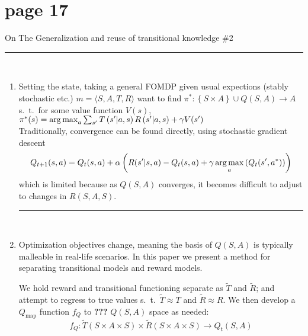 \section*{page 17}

On The Generalization and reuse of transitional knowledge \#2\\

\hrule
{\ }\\
\begin{enumerate}[label=\protect\circled{\arabic*}]

\item Setting the state, taking a general FOMDP given usual expections (stably stochastic etc.) $m=\langle S,A,T,R \rangle$ want to find $\pi^{\ast}:\left\{ S \times A \right\} \cup Q(S,A) \rightarrow A$ s.\ t.\ for some value function $V(s)$, $\pi^{\ast}(s) = \operatorname*{arg\,max}_{a} \sum_{s^\prime} T \left( s^\prime \middle| a, s \right) R\left( s^\prime \middle| a, s \right) + \gamma V(s^\prime)$\\

Traditionally, convergence can be found directly, using stochastic gradient descent
\begin{equation*}
Q_{t+1}(s,a) = Q_t(s,a) +\alpha\left( R(s^\prime|s,a) -Q_t(s,a) + \gamma \operatorname*{arg\,max}_{a} \left( Q_t(s^\prime, a^\ast )\right)\right)
\end{equation*}
which is limited because as $Q(S,A)$ converges, it becomes difficult to adjust to changes in $R(S,A,S)$.
{\ }\\
\hrule
{\ }\\

\item Optimization objectives change, meaning the basis of $Q(S,A)$ is typically malleable in real-life scenarios. In this paper we present a method for separating transitional models and reward models.

We hold reward and transitional functioning separate as $\tilde{T}$ and $\tilde{R}$; and attempt to regress to true values s.\ t.\ $\tilde{T}\approx T$ and $\tilde{R} \approx R$. We then develop a $Q_{\text{map}}$ function $f_Q$ to \textbf{???} $Q(S,A)$ space as needed:
\begin{equation*}
f_Q:\tilde{T}\left( S \times A \times S \right) \times \tilde{R}\left( S \times A \times S \right) \rightarrow Q_t\left( S ,A \right)
\end{equation*}
\end{enumerate}